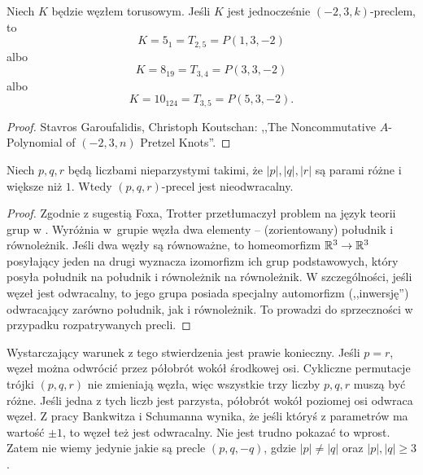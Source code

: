 \begin{proposition}
    Niech $K$ będzie węzłem torusowym.
    Jeśli $K$ jest jednocześnie $(-2, 3, k)$-preclem, to
    \begin{equation}
        K = 5_{1} = T_{2,5} = P(1, 3, -2)
    \end{equation}
    albo
    \begin{equation}
        K = 8_{19} = T_{3,4} = P(3, 3, -2)
    \end{equation}
    albo
    \begin{equation}
        K = 10_{124} = T_{3,5} = P(5, 3, -2).
    \end{equation}
\end{proposition}

\begin{proof}
    Stavros Garoufalidis, Christoph Koutschan: ,,The Noncommutative $A$-Polynomial of $(-2,3,n)$ Pretzel Knots''.
\end{proof}

\begin{proposition}
    \label{trotter}
    Niech $p, q, r$ będą liczbami nieparzystymi takimi, że $|p|, |q|, |r|$ są parami różne i większe niż $1$.
    Wtedy $(p, q, r)$-precel jest nieodwracalny.
\end{proposition}

\begin{proof}
    Zgodnie z sugestią Foxa, Trotter przetłumaczył problem na język teorii grup w \cite{trotter63}.
    Wyróżnia w~grupie węzła dwa elementy -- (zorientowany) południk i równoleżnik.
    Jeśli dwa węzły są równoważne, to homeomorfizm $\mathbb R^3 \to \mathbb R^3$ posyłający jeden na drugi wyznacza izomorfizm ich grup podstawowych, który posyła południk na południk i równoleżnik na równoleżnik.
    W szczególności, jeśli węzeł jest odwracalny, to jego grupa posiada specjalny automorfizm (,,inwersję'') odwracający zarówno południk, jak i równoleżnik.
    To prowadzi do sprzeczności w przypadku rozpatrywanych precli.
\end{proof}

Wystarczający warunek z tego stwierdzenia jest prawie konieczny.
Jeśli $p = r$, węzeł można odwrócić przez półobrót wokół środkowej osi.
Cykliczne permutacje trójki $(p, q, r)$ nie zmieniają węzła, więc wszystkie trzy liczby $p, q, r$ muszą być różne.
Jeśli jedna z tych liczb jest parzysta, półobrót wokół poziomej osi odwraca węzeł.
Z pracy Bankwitza i Schumanna wynika, że jeśli któryś z parametrów ma wartość $\pm 1$, to węzeł też jest odwracalny.
Nie jest trudno pokazać to wprost.
Zatem nie wiemy jedynie jakie są precle $(p, q, -q)$, gdzie $|p| \neq |q|$ oraz $|p|, |q| \ge 3$.

